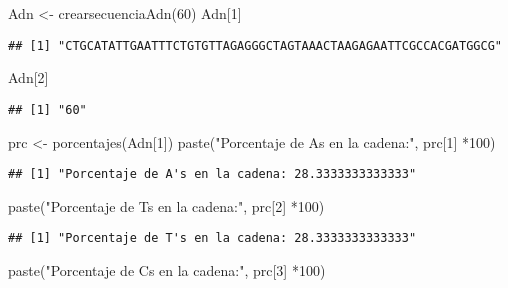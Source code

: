 \documentclass[
]{article}
\newenvironment{Shaded}{\begin{snugshade}}{\end{snugshade}}
\newcommand{\DecValTok}[1]{\textcolor[rgb]{0.00,0.00,0.81}{#1}}
\newcommand{\FunctionTok}[1]{\textcolor[rgb]{0.00,0.00,0.00}{#1}}
\newcommand{\NormalTok}[1]{#1}
\newcommand{\OtherTok}[1]{\textcolor[rgb]{0.56,0.35,0.01}{#1}}
\newcommand{\SpecialCharTok}[1]{\textcolor[rgb]{0.00,0.00,0.00}{#1}}
\newcommand{\StringTok}[1]{\textcolor[rgb]{0.31,0.60,0.02}{#1}}
\begin{document}
\begin{Shaded}
\begin{Highlighting}[]
\NormalTok{Adn }\OtherTok{\textless{}{-}} \FunctionTok{crearsecuenciaAdn}\NormalTok{(}\DecValTok{60}\NormalTok{)}
\NormalTok{Adn[}\DecValTok{1}\NormalTok{]}
\end{Highlighting}
\end{Shaded}

\begin{verbatim}
## [1] "CTGCATATTGAATTTCTGTGTTAGAGGGCTAGTAAACTAAGAGAATTCGCCACGATGGCG"
\end{verbatim}

\begin{Shaded}
\begin{Highlighting}[]
\NormalTok{Adn[}\DecValTok{2}\NormalTok{]}
\end{Highlighting}
\end{Shaded}

\begin{verbatim}
## [1] "60"
\end{verbatim}

\begin{Shaded}
\begin{Highlighting}[]
\NormalTok{prc }\OtherTok{\textless{}{-}} \FunctionTok{porcentajes}\NormalTok{(Adn[}\DecValTok{1}\NormalTok{])}
\FunctionTok{paste}\NormalTok{(}\StringTok{"Porcentaje de A\textquotesingle{}s en la cadena:"}\NormalTok{, prc[}\DecValTok{1}\NormalTok{] }\SpecialCharTok{*}\DecValTok{100}\NormalTok{)}
\end{Highlighting}
\end{Shaded}

\begin{verbatim}
## [1] "Porcentaje de A's en la cadena: 28.3333333333333"
\end{verbatim}

\begin{Shaded}
\begin{Highlighting}[]
\FunctionTok{paste}\NormalTok{(}\StringTok{"Porcentaje de T\textquotesingle{}s en la cadena:"}\NormalTok{, prc[}\DecValTok{2}\NormalTok{] }\SpecialCharTok{*}\DecValTok{100}\NormalTok{)}
\end{Highlighting}
\end{Shaded}

\begin{verbatim}
## [1] "Porcentaje de T's en la cadena: 28.3333333333333"
\end{verbatim}

\begin{Shaded}
\begin{Highlighting}[]
\FunctionTok{paste}\NormalTok{(}\StringTok{"Porcentaje de C\textquotesingle{}s en la cadena:"}\NormalTok{, prc[}\DecValTok{3}\NormalTok{] }\SpecialCharTok{*}\DecValTok{100}\NormalTok{)}
\end{Highlighting}
\end{Shaded}
\end{document}
